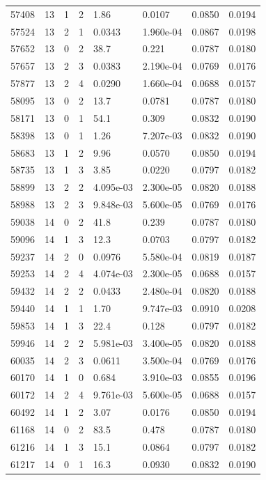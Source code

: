 \documentclass[preview]{standalone}
\begin{document}
{{{{\begin{tabular}{L{1.2cm}C{1.2cm} C{0.3cm}C{0.5cm} C{1.4cm}C{1.4cm} C{1.4cm}C{1.4cm}}
  57408  &    13  & 1     &  2 &  1.86  & 0.0107  & 0.0850 &  0.0194   \\ 
  57524  &    13  & 2     &  1 &  0.0343  & 1.960e-04  & 0.0867 &  0.0198   \\ 
  57652  &    13  & 0     &  2 &  38.7  & 0.221  & 0.0787 &  0.0180   \\ 
  57657  &    13  & 2     &  3 &  0.0383  & 2.190e-04  & 0.0769 &  0.0176   \\ 
  57877  &    13  & 2     &  4 &  0.0290  & 1.660e-04  & 0.0688 &  0.0157   \\ 
  58095  &    13  & 0     &  2 &  13.7  & 0.0781  & 0.0787 &  0.0180   \\ 
  58171  &    13  & 0     &  1 &  54.1  & 0.309  & 0.0832 &  0.0190   \\ 
  58398  &    13  & 0     &  1 &  1.26  & 7.207e-03  & 0.0832 &  0.0190   \\ 
  58683  &    13  & 1     &  2 &  9.96  & 0.0570  & 0.0850 &  0.0194   \\ 
  58735  &    13  & 1     &  3 &  3.85  & 0.0220  & 0.0797 &  0.0182   \\ 
  58899  &    13  & 2     &  2 &  4.095e-03  & 2.300e-05  & 0.0820 &  0.0188   \\ 
  58988  &    13  & 2     &  3 &  9.848e-03  & 5.600e-05  & 0.0769 &  0.0176   \\ 
  59038  &    14  & 0     &  2 &  41.8  & 0.239  & 0.0787 &  0.0180   \\ 
  59096  &    14  & 1     &  3 &  12.3  & 0.0703  & 0.0797 &  0.0182   \\ 
  59237  &    14  & 2     &  0 &  0.0976  & 5.580e-04  & 0.0819 &  0.0187   \\ 
  59253  &    14  & 2     &  4 &  4.074e-03  & 2.300e-05  & 0.0688 &  0.0157   \\ 
  59432  &    14  & 2     &  2 &  0.0433  & 2.480e-04  & 0.0820 &  0.0188   \\ 
  59440  &    14  & 1     &  1 &  1.70  & 9.747e-03  & 0.0910 &  0.0208   \\ 
  59853  &    14  & 1     &  3 &  22.4  & 0.128  & 0.0797 &  0.0182   \\ 
  59946  &    14  & 2     &  2 &  5.981e-03  & 3.400e-05  & 0.0820 &  0.0188   \\ 
  60035  &    14  & 2     &  3 &  0.0611  & 3.500e-04  & 0.0769 &  0.0176   \\ 
  60170  &    14  & 1     &  0 &  0.684  & 3.910e-03  & 0.0855 &  0.0196   \\ 
  60172  &    14  & 2     &  4 &  9.761e-03  & 5.600e-05  & 0.0688 &  0.0157   \\ 
  60492  &    14  & 1     &  2 &  3.07  & 0.0176  & 0.0850 &  0.0194   \\ 
  61168  &    14  & 0     &  2 &  83.5  & 0.478  & 0.0787 &  0.0180   \\ 
  61216  &    14  & 1     &  3 &  15.1  & 0.0864  & 0.0797 &  0.0182   \\ 
  61217  &    14  & 0     &  1 &  16.3  & 0.0930  & 0.0832 &  0.0190   \\ 
\hline 
\end{tabular} 

}}}}
\end{document}
